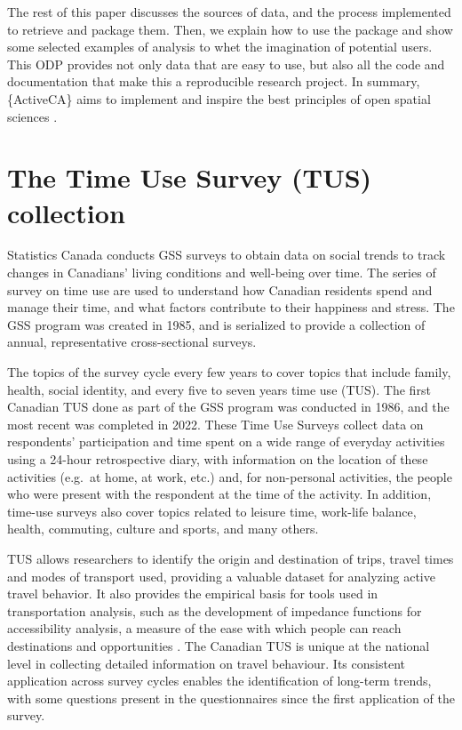 \documentclass[Royal,times,sageh]{sagej}
\begin{document}
The rest of this paper discusses the sources of data, and the process
implemented to retrieve and package them. Then, we explain how to use
the package and show some selected examples of analysis to whet the
imagination of potential users. This ODP provides not only data that are
easy to use, but also all the code and documentation that make this a
reproducible research project. In summary, \{ActiveCA\} aims to
implement and inspire the best principles of open spatial sciences
\citep{paez_open_2021, brunsdon_opening_2021}.

\section{The Time Use Survey (TUS)
collection}\label{the-time-use-survey-tus-collection}

Statistics Canada \citeyearpar{statisticscanada2024} conducts GSS
surveys to obtain data on social trends to track changes in Canadians'
living conditions and well-being over time. The series of survey on time
use are used to understand how Canadian residents spend and manage their
time, and what factors contribute to their happiness and stress. The GSS
program was created in 1985, and is serialized to provide a collection
of annual, representative cross-sectional surveys.

The topics of the survey cycle every few years to cover topics that
include family, health, social identity, and every five to seven years
time use (TUS). The first Canadian TUS done as part of the GSS program
was conducted in 1986, and the most recent was completed in 2022. These
Time Use Surveys \citep{statisticscanada2022} collect data on
respondents' participation and time spent on a wide range of everyday
activities using a 24-hour retrospective diary, with information on the
location of these activities (e.g.~at home, at work, etc.) and, for
non-personal activities, the people who were present with the respondent
at the time of the activity. In addition, time-use surveys also cover
topics related to leisure time, work-life balance, health, commuting,
culture and sports, and many others.

TUS allows researchers to identify the origin and destination of trips,
travel times and modes of transport used, providing a valuable dataset
for analyzing active travel behavior. It also provides the empirical
basis for tools used in transportation analysis, such as the development
of impedance functions for accessibility analysis, a measure of the ease
with which people can reach destinations and opportunities
\citep{hansen1959, paez2012}. The Canadian TUS is unique at the national
level in collecting detailed information on travel behaviour. Its
consistent application across survey cycles enables the identification
of long-term trends, with some questions present in the questionnaires
since the first application of the survey.
\end{document}
